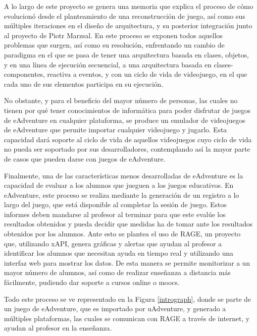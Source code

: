 A lo largo de este proyecto se genera una memoria que explica el proceso de cómo evolucionó desde el planteamiento de una reconstrucción de juego, así como sus múltiples iteraciones en el diseño de arquitectura, y su posterior integración junto al proyecto de Piotr Marzsal. En este proceso se exponen todos aquellos problemas que surgen, así como su resolución, enfrentando un cambio de paradigma en el que se pasa de tener una arquitectura basada en clases, objetos, y en una línea de ejecución secuencial, a una arquitectura basada en clases-componentes, reactiva a eventos, y con un ciclo de vida de videojuego, en el que cada uno de sus elementos participa en su ejecución.

No obstante, y para el beneficio del mayor número de personas, las cuales no tienen por qué tener conocimientos de informática para poder disfrutar de juegos de eAdventure en cualquier plataforma, se produce un emulador de videojuegos de eAdventure que permite importar cualquier videojuego y jugarlo. Esta capacidad dará soporte al ciclo de vida de aquellos videojuegos cuyo ciclo de vida no pueda ser soportado por sus desarrolladores, contemplando así la mayor parte de casos que pueden darse con juegos de eAdventure.

Finalmente, una de las características menos desarrolladas de eAdventure es la capacidad de evaluar a los alumnos que jueguen a los juegos educativos. En eAdventure, este proceso se realiza mediante la generación de un registro a lo largo del juego, que está disponible al completar la sesión de juego. Estos informes deben mandarse al profesor al terminar para que este evalúe los resultados obtenidos y pueda decidir que medidas ha de tomar ante los resultados obtenidos por los alumnos. Ante esto se plantea el uso de RAGE, un proyecto que, utilizando xAPI, genera gráficas y alertas que ayudan al profesor a identificar los alumnos que necesitan ayuda en tiempo real y utilizando una interfaz web para mostrar los datos. De esta manera se permite monitorizar a un mayor número de alumnos, así como de realizar enseñanza a distancia más fácilmente, pudiendo dar soporte a cursos online o moocs.

Todo este proceso se ve representado en la Figura \ref{intrograph}, donde se parte de un juego de eAdventure, que es importado por uAdventure, y generado a múltiples plataformas, las cuales se comunican con RAGE a través de internet, y ayudan al profesor en la enseñanza.


